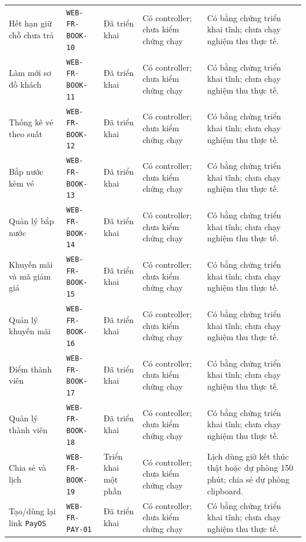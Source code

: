 \begin{longtable}{@{}P{0.19000\SRSWidth}P{0.18000\SRSWidth}P{0.15000\SRSWidth}P{0.20000\SRSWidth}P{0.28000\SRSWidth}@{}}
Hết hạn giữ chỗ chưa trả & \texttt{WEB-\allowbreak{}FR-\allowbreak{}BOOK-\allowbreak{}10} & Đã triển khai & Có controller; chưa kiểm chứng chạy & Có bằng chứng triển khai tĩnh; chưa chạy nghiệm thu thực tế. \\[3pt]
Làm mới sơ đồ khách & \texttt{WEB-\allowbreak{}FR-\allowbreak{}BOOK-\allowbreak{}11} & Đã triển khai & Có controller; chưa kiểm chứng chạy & Có bằng chứng triển khai tĩnh; chưa chạy nghiệm thu thực tế. \\[3pt]
Thống kê vé theo suất & \texttt{WEB-\allowbreak{}FR-\allowbreak{}BOOK-\allowbreak{}12} & Đã triển khai & Có controller; chưa kiểm chứng chạy & Có bằng chứng triển khai tĩnh; chưa chạy nghiệm thu thực tế. \\[3pt]
Bắp nước kèm vé & \texttt{WEB-\allowbreak{}FR-\allowbreak{}BOOK-\allowbreak{}13} & Đã triển khai & Có controller; chưa kiểm chứng chạy & Có bằng chứng triển khai tĩnh; chưa chạy nghiệm thu thực tế. \\[3pt]
Quản lý bắp nước & \texttt{WEB-\allowbreak{}FR-\allowbreak{}BOOK-\allowbreak{}14} & Đã triển khai & Có controller; chưa kiểm chứng chạy & Có bằng chứng triển khai tĩnh; chưa chạy nghiệm thu thực tế. \\[3pt]
Khuyến mãi và mã giảm giá & \texttt{WEB-\allowbreak{}FR-\allowbreak{}BOOK-\allowbreak{}15} & Đã triển khai & Có controller; chưa kiểm chứng chạy & Có bằng chứng triển khai tĩnh; chưa chạy nghiệm thu thực tế. \\[3pt]
Quản lý khuyến mãi & \texttt{WEB-\allowbreak{}FR-\allowbreak{}BOOK-\allowbreak{}16} & Đã triển khai & Có controller; chưa kiểm chứng chạy & Có bằng chứng triển khai tĩnh; chưa chạy nghiệm thu thực tế. \\[3pt]
Điểm thành viên & \texttt{WEB-\allowbreak{}FR-\allowbreak{}BOOK-\allowbreak{}17} & Đã triển khai & Có controller; chưa kiểm chứng chạy & Có bằng chứng triển khai tĩnh; chưa chạy nghiệm thu thực tế. \\[3pt]
Quản lý thành viên & \texttt{WEB-\allowbreak{}FR-\allowbreak{}BOOK-\allowbreak{}18} & Đã triển khai & Có controller; chưa kiểm chứng chạy & Có bằng chứng triển khai tĩnh; chưa chạy nghiệm thu thực tế. \\[3pt]
Chia sẻ và lịch & \texttt{WEB-\allowbreak{}FR-\allowbreak{}BOOK-\allowbreak{}19} & Triển khai một phần & Có controller; chưa kiểm chứng chạy & Lịch dùng giờ kết thúc thật hoặc dự phòng 150 phút; chia sẻ dự phòng clipboard. \\[3pt]
Tạo/\allowbreak{}dùng lại link \texttt{Pay\allowbreak{}OS} & \texttt{WEB-\allowbreak{}FR-\allowbreak{}PAY-\allowbreak{}01} & Đã triển khai & Có controller; chưa kiểm chứng chạy & Có bằng chứng triển khai tĩnh; chưa chạy nghiệm thu thực tế. \\[3pt]

\end{longtable}
